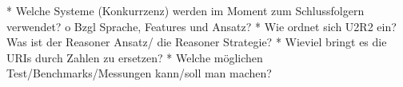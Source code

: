     * Welche Systeme (Konkurrzenz) werden im Moment zum Schlussfolgern verwendet?
          o Bzgl Sprache, Features und Ansatz? 
    * Wie ordnet sich U2R2 ein? Was ist der Reasoner Ansatz/ die Reasoner Strategie?
    * Wieviel bringt es die URIs durch Zahlen zu ersetzen?
    * Welche möglichen Test/Benchmarks/Messungen kann/soll man machen? 